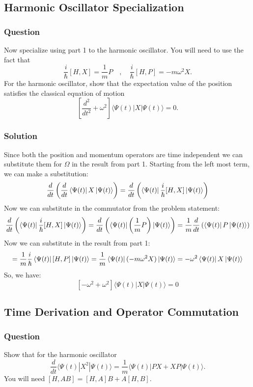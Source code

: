 \documentclass[12pt]{article}
\begin{document}
\subsection{Harmonic Oscillator Specialization}
\subsubsection{Question}
Now specialize using part 1 to the harmonic oscillator. You will need to use the fact that
\[
\frac{i}{\hbar} [H, X] = \frac{1}{m} P \quad , \quad \frac{i}{\hbar} [H, P] = -m\omega^2X.
\]
For the harmonic oscillator, show that the expectation value of the position satisfies the classical equation of motion
\[
\left[ \frac{d^2}{dt^2} + \omega^2 \right] \langle \Psi(t)|X|\Psi(t)\rangle = 0.
\]
\subsubsection{Solution}
Since both the position and momentum operators are time independent we can substitute them for \(\Omega\) in the result from part 1. Starting from the left most term, we can make a substitution:
\begin{equation}
    \frac{d}{dt}\left(\frac{d}{dt}\bra{\Psi (t)}X\ket{\Psi (t)}\right) = \frac{d}{dt}\left(\bra{\Psi(t)}\frac{i}{\hbar}[H, X]\ket{\Psi(t)}\right)
\end{equation}
Now we can substitute in the commutator from the problem statement:
\begin{equation}
    \frac{d}{dt}\left(\bra{\Psi(t)}\frac{i}{\hbar}[H, X]\ket{\Psi(t)}\right) = \frac{d}{dt}\left(\bra{\Psi(t)}\left(\frac{1}{m}P\right)\ket{\Psi(t)}\right) = \frac{1}{m} \frac{d}{dt}\left(\bra{\Psi(t)}P\ket{\Psi(t)}\right)
\end{equation}
Now we can substitute in the result from part 1:
\begin{equation}
    = \frac{1}{m} \frac{i}{\hbar}\bra{\Psi(t)}[H, P]\ket{\Psi(t)} = \frac{1}{m} \bra{\Psi(t)}(-m\omega^{2}X)\ket{\Psi(t)} = -\omega^{2}\bra{\Psi(t)}X\ket{\Psi(t)}
\end{equation}
So, we have:
\begin{equation}
    \boxed{[ -\omega ^{2} + \omega^2 ] \langle \Psi(t)|X|\Psi(t)\rangle = 0}
\end{equation}
\subsection{Time Derivation and Operator Commutation}
\subsubsection{Question}
Show that for the harmonic oscillator
\[
\frac{d}{dt} \langle \Psi(t)|X^2|\Psi(t)\rangle = \frac{1}{m} \langle \Psi(t)|PX + XP|\Psi(t)\rangle.
\]
You will need $[H, AB] = [H, A]B + A[H, B]$.
\end{document}
